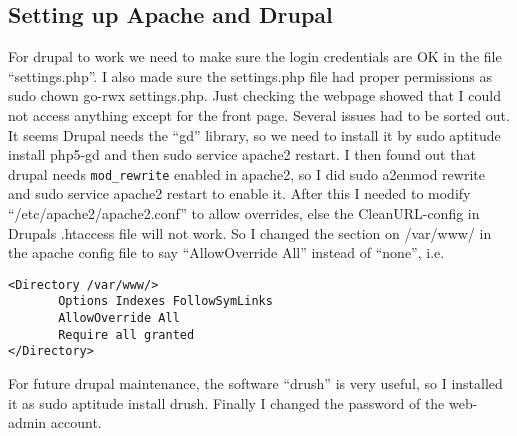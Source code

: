 \subsection{Setting up Apache and Drupal}
For drupal to work we need to make sure the login credentials are OK in the
file “settings.php”. I also made sure the settings.php file had proper
permissions as sudo chown go-rwx settings.php. Just checking the webpage showed
that I could not access anything except for the front page. Several issues had
to be sorted out. It seems Drupal needs the “gd” library, so we need to install
it by sudo aptitude install php5-gd and then sudo service apache2 restart. I
then found out that drupal needs \verb!mod_rewrite! enabled in apache2, so I did
sudo a2enmod rewrite and sudo service apache2 restart to enable it. After this
I needed to modify “/etc/apache2/apache2.conf” to allow overrides, else the
CleanURL-config in Drupals .htaccess file will not work. So I changed the
section on /var/www/ in the apache config file to say “AllowOverride All”
instead of “none”, i.e.  
\begin{verbatim}
<Directory /var/www/>
       Options Indexes FollowSymLinks
       AllowOverride All
       Require all granted
</Directory>
\end{verbatim}
For future drupal maintenance, the software “drush” is very useful, so I
installed it as sudo aptitude install drush. Finally I changed the password of
the web-admin account.  

